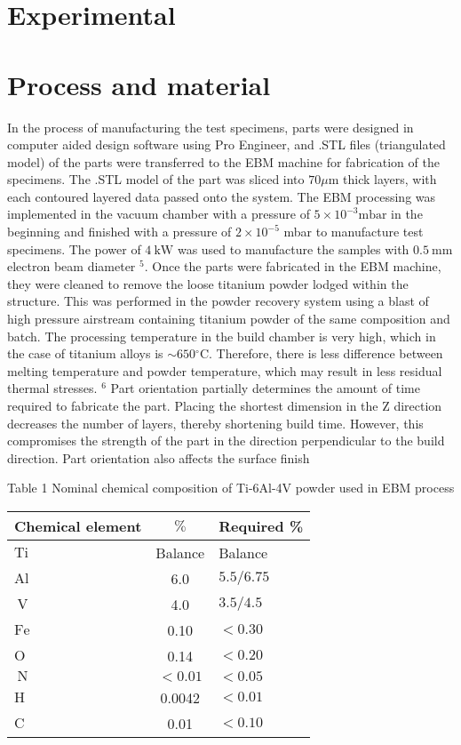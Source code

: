 \documentclass[10pt]{article}
\begin{document}
\section*{Experimental}
\section*{Process and material}
In the process of manufacturing the test specimens, parts were designed in computer aided design software using Pro Engineer, and .STL files (triangulated model) of the parts were transferred to the EBM machine for fabrication of the specimens. The .STL model of the part was sliced into $70 \mu \mathrm{m}$ thick layers, with each contoured layered data passed onto the system. The EBM processing was implemented in the vacuum chamber with a pressure of $5 \times 10^{-3} \mathrm{mbar}$ in the beginning and finished with a pressure of $2 \times 10^{-5}$ mbar to manufacture test specimens. The power of $4 \mathrm{~kW}$ was used to manufacture the samples with $0.5 \mathrm{~mm}$ electron beam diameter ${ }^{5}$. Once the parts were fabricated in the EBM machine, they were cleaned to remove the loose titanium powder lodged within the structure. This was performed in the powder recovery system using a blast of high pressure airstream containing titanium powder of the same composition and batch. The processing temperature in the build chamber is very high, which in the case of titanium alloys is $\sim 650{ }^{\circ} \mathrm{C}$. Therefore, there is less difference between melting temperature and powder temperature, which may result in less residual thermal stresses. ${ }^{6}$ Part orientation partially determines the amount of time required to fabricate the part. Placing the shortest dimension in the $\mathrm{Z}$ direction decreases the number of layers, thereby shortening build time. However, this compromises the strength of the part in the direction perpendicular to the build direction. Part orientation also affects the surface finish

Table 1 Nominal chemical composition of Ti-6Al-4V powder used in EBM process

\begin{center}
\begin{tabular}{lcl}
\hline
Chemical element & $\%$ & Required \% \\
\hline
$\mathrm{Ti}$ & Balance & Balance \\
$\mathrm{Al}$ & 6.0 & $5.5 / 6.75$ \\
$\mathrm{~V}$ & 4.0 & $3.5 / 4.5$ \\
$\mathrm{Fe}$ & 0.10 & $<0.30$ \\
$\mathrm{O}$ & 0.14 & $<0.20$ \\
$\mathrm{~N}$ & $<0.01$ & $<0.05$ \\
$\mathrm{H}$ & 0.0042 & $<0.01$ \\
$\mathrm{C}$ & 0.01 & $<0.10$ \\
\hline
\end{tabular}
\end{center}
\end{document}
